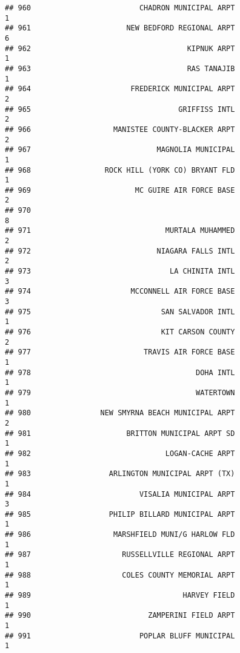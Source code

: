 \documentclass[
]{article}
\begin{document}
\begin{verbatim}
## 960                         CHADRON MUNICIPAL ARPT                           1
## 961                      NEW BEDFORD REGIONAL ARPT                           6
## 962                                    KIPNUK ARPT                           1
## 963                                    RAS TANAJIB                           1
## 964                       FREDERICK MUNICIPAL ARPT                           2
## 965                                  GRIFFISS INTL                           2
## 966                   MANISTEE COUNTY-BLACKER ARPT                           2
## 967                             MAGNOLIA MUNICIPAL                           1
## 968                 ROCK HILL (YORK CO) BRYANT FLD                           1
## 969                        MC GUIRE AIR FORCE BASE                           2
## 970                                                                          8
## 971                               MURTALA MUHAMMED                           2
## 972                             NIAGARA FALLS INTL                           2
## 973                                LA CHINITA INTL                           3
## 974                       MCCONNELL AIR FORCE BASE                           3
## 975                              SAN SALVADOR INTL                           1
## 976                              KIT CARSON COUNTY                           2
## 977                          TRAVIS AIR FORCE BASE                           1
## 978                                      DOHA INTL                           1
## 979                                      WATERTOWN                           1
## 980                NEW SMYRNA BEACH MUNICIPAL ARPT                           2
## 981                      BRITTON MUNICIPAL ARPT SD                           1
## 982                               LOGAN-CACHE ARPT                           1
## 983                  ARLINGTON MUNICIPAL ARPT (TX)                           1
## 984                         VISALIA MUNICIPAL ARPT                           3
## 985                  PHILIP BILLARD MUNICIPAL ARPT                           1
## 986                   MARSHFIELD MUNI/G HARLOW FLD                           1
## 987                     RUSSELLVILLE REGIONAL ARPT                           1
## 988                     COLES COUNTY MEMORIAL ARPT                           1
## 989                                   HARVEY FIELD                           1
## 990                           ZAMPERINI FIELD ARPT                           1
## 991                         POPLAR BLUFF MUNICIPAL                           1

\end{verbatim}
\end{document}
